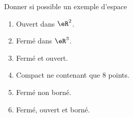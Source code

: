
\begin{exercice}\label{exo0071}

Donner si possible un exemple d'espace 
\begin{enumerate}
	\item Ouvert dans $\eR^2$.
	\item Fermé dans $\eR^3$.
	\item Fermé et ouvert.
	\item Compact ne contenant que $8$ points.
	\item Fermé non borné.
	\item Fermé, ouvert et borné.
\end{enumerate}

\end{exercice}
